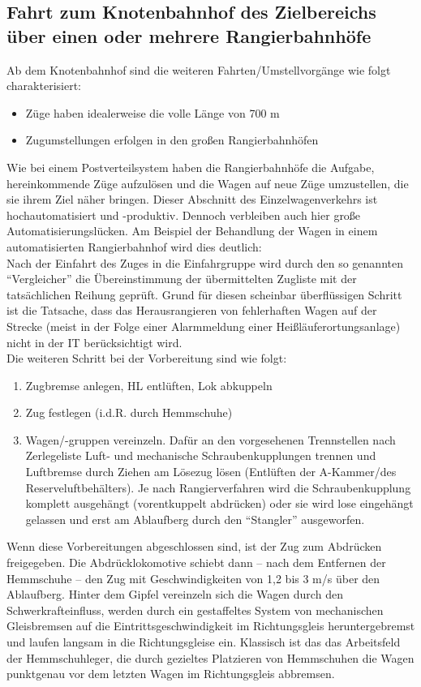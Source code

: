 \subsection{Fahrt zum Knotenbahnhof des Zielbereichs über einen oder mehrere Rangierbahnhöfe}
Ab dem Knotenbahnhof sind die weiteren Fahrten/Umstellvorgänge wie folgt charakterisiert:
\begin{itemize}
    \item Züge haben idealerweise die volle Länge von 700 m
    \item Zugumstellungen erfolgen in den großen Rangierbahnhöfen
\end{itemize}
Wie bei einem Postverteilsystem haben die Rangierbahnhöfe die Aufgabe, hereinkommende Züge aufzulösen und die Wagen auf neue Züge umzustellen, die sie ihrem Ziel näher bringen. Dieser Abschnitt des Einzelwagenverkehrs ist hochautomatisiert und -produktiv. Dennoch verbleiben auch hier große Automatisierungslücken. Am Beispiel der Behandlung der Wagen in einem automatisierten Rangierbahnhof wird dies deutlich:\\
Nach der Einfahrt des Zuges in die Einfahrgruppe wird durch den so genannten "`Vergleicher"' die Übereinstimmung der übermittelten Zugliste mit der tatsächlichen Reihung geprüft. Grund für diesen scheinbar überflüssigen Schritt ist die Tatsache, dass das Herausrangieren von fehlerhaften Wagen auf der Strecke (meist in der Folge einer Alarmmeldung einer Heißläuferortungsanlage) nicht in der IT berücksichtigt wird.\\
Die weiteren Schritt bei der Vorbereitung sind wie folgt:
\begin{enumerate}
    \item Zugbremse anlegen, HL entlüften, Lok abkuppeln
    \item Zug festlegen (i.d.R. durch Hemmschuhe)
    \item Wagen/-gruppen vereinzeln. Dafür an den vorgesehenen Trennstellen nach Zerlegeliste Luft- und mechanische Schraubenkupplungen trennen und Luftbremse durch Ziehen am Lösezug lösen (Entlüften der A-Kammer/des Reserveluftbehälters). Je nach Rangierverfahren wird die Schraubenkupplung komplett ausgehängt (vorentkuppelt abdrücken) oder sie wird lose eingehängt gelassen und erst am Ablaufberg durch den "`Stangler"' ausgeworfen.
\end{enumerate}
Wenn diese Vorbereitungen abgeschlossen sind, ist der Zug zum Abdrücken freigegeben. Die Abdrücklokomotive schiebt dann -- nach dem Entfernen der Hemmschuhe -- den Zug mit Geschwindigkeiten von 1,2 bis 3 m/s über den Ablaufberg. Hinter dem Gipfel vereinzeln sich die Wagen durch den Schwerkrafteinfluss, werden durch ein gestaffeltes System von mechanischen Gleisbremsen auf die Eintrittsgeschwindigkeit im Richtungsgleis heruntergebremst und laufen langsam in die Richtungsgleise ein.  Klassisch ist das das Arbeitsfeld der Hemmschuhleger, die durch gezieltes Platzieren von Hemmschuhen die Wagen punktgenau vor dem letzten Wagen im Richtungsgleis abbremsen.\\
